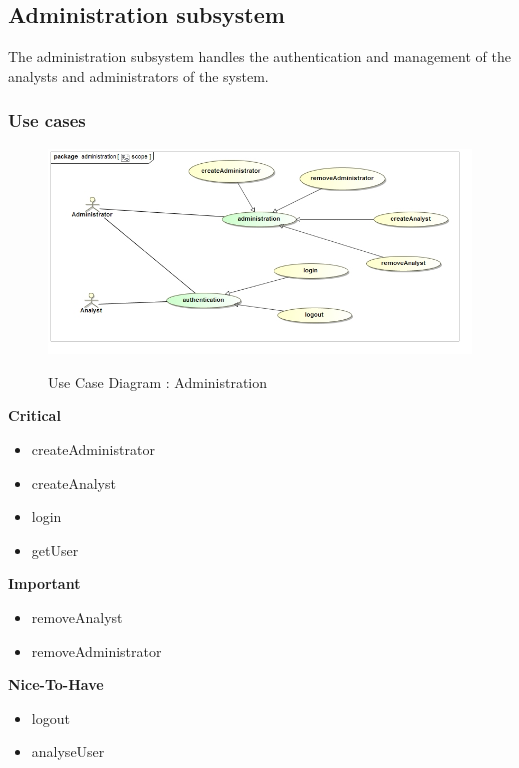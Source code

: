 \documentclass{article}
\begin{document}

	\pagebreak
	\subsection{Administration subsystem}\label{subsec:Admin}
	The administration subsystem handles the authentication and management of the analysts and administrators of the system.
		\subsubsection{Use cases}
		\begin{figure}[H]
		\includegraphics[width=\textwidth]{images/uc__administration__scope.jpg}  \\
		\caption{Use Case Diagram : Administration}
		\end{figure}

		\begin{flushleft}
			\textbf{Critical}
				\begin{itemize}
					\item createAdministrator
					\item createAnalyst
					\item login
					\item getUser
				\end{itemize}
			\textbf{Important}
				\begin{itemize}
					\item removeAnalyst
					\item removeAdministrator
				\end{itemize}

			\textbf{Nice-To-Have}
				\begin{itemize}
					\item logout
					\item analyseUser
				\end{itemize}
		\end{flushleft}
\end{document}
